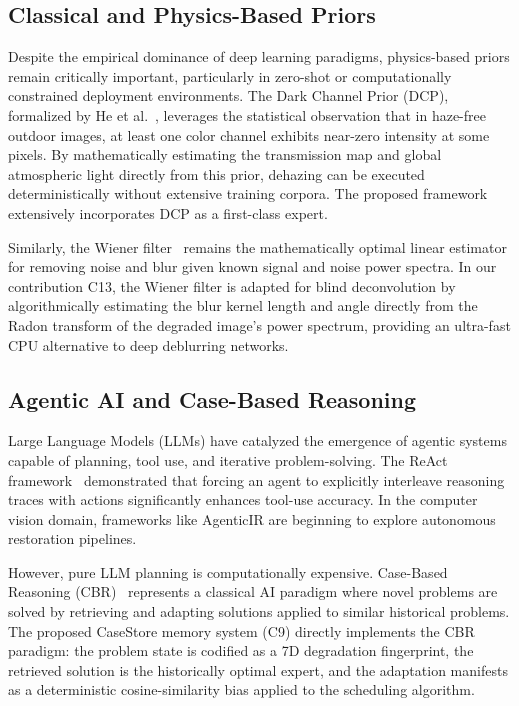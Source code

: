 \documentclass[journal, 10pt]{IEEEtran}
\begin{document}
\subsection{Classical and Physics-Based Priors}
Despite the empirical dominance of deep learning paradigms, physics-based priors remain critically important, particularly in zero-shot or computationally constrained deployment environments. The Dark Channel Prior (DCP), formalized by He et al.~\cite{he2011dcp}, leverages the statistical observation that in haze-free outdoor images, at least one color channel exhibits near-zero intensity at some pixels. By mathematically estimating the transmission map and global atmospheric light directly from this prior, dehazing can be executed deterministically without extensive training corpora. The proposed framework extensively incorporates DCP as a first-class expert.

Similarly, the Wiener filter~\cite{wiener1949extrapolation} remains the mathematically optimal linear estimator for removing noise and blur given known signal and noise power spectra. In our contribution C13, the Wiener filter is adapted for blind deconvolution by algorithmically estimating the blur kernel length and angle directly from the Radon transform of the degraded image's power spectrum, providing an ultra-fast CPU alternative to deep deblurring networks.

\subsection{Agentic AI and Case-Based Reasoning}
Large Language Models (LLMs) have catalyzed the emergence of agentic systems capable of planning, tool use, and iterative problem-solving. The ReAct framework~\cite{yao2023react} demonstrated that forcing an agent to explicitly interleave reasoning traces with actions significantly enhances tool-use accuracy. In the computer vision domain, frameworks like AgenticIR are beginning to explore autonomous restoration pipelines.

However, pure LLM planning is computationally expensive. Case-Based Reasoning (CBR)~\cite{aamodt1994cbr} represents a classical AI paradigm where novel problems are solved by retrieving and adapting solutions applied to similar historical problems. The proposed CaseStore memory system (C9) directly implements the CBR paradigm: the problem state is codified as a 7D degradation fingerprint, the retrieved solution is the historically optimal expert, and the adaptation manifests as a deterministic cosine-similarity bias applied to the scheduling algorithm.
\end{document}
